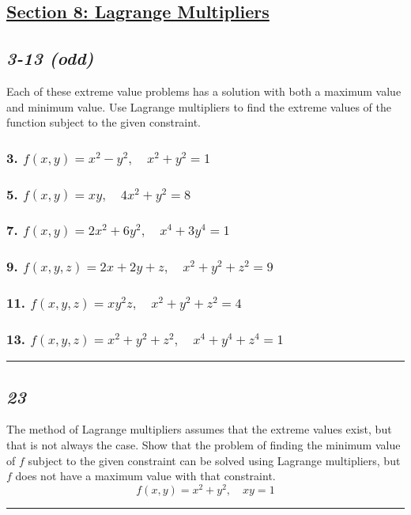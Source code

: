 \documentclass{article}
\newcommand{\spc}{\vspace{1em}\hrule\vspace{1em}}
\begin{document}
{{{{{{{{{{{{\begin{center}
    \section*{\underline{Section 8: Lagrange Multipliers}}
\end{center}
\begin{center}
    \subsection*{\textit{3-13 (odd)}} 
\end{center}
Each of these extreme value problems has a solution with both a maximum
value and minimum value. Use Lagrange multipliers to find the extreme values
of the function subject to the given constraint. 
\subsubsection*{3. $f(x,y) = x^2 -y^2,\quad x^2+y^2=1$}
\subsubsection*{5. $f(x,y) = xy,\quad 4x^2+y^2=8$}
\subsubsection*{7. $f(x,y) = 2x^2+6y^2,\quad x^4+3y^4=1$}
\subsubsection*{9. $f(x,y, z) = 2x+2y+z,\quad x^2+y^2+z^2 = 9$}
\subsubsection*{11. $f(x,y, z) = xy^2z,\quad x^2+y^2+z^2=4$}
\subsubsection*{13. $f(x,y, z) = x^2+y^2+z^2,\quad x^4+y^4+z^4=1$}
\spc
\begin{center}
    \subsection*{\textit{23}} 
\end{center}
The method of Lagrange multipliers assumes that the extreme values exist,
but that is not always the case. Show that the problem of finding the
minimum value of $f$ subject to the given constraint can be solved using
Lagrange multipliers, but $f$ does not have a maximum value with that constraint.
\[
f(x,y) = x^2+y^2,\quad xy=1
\]
\spc
\begin{center}

\end{center}}}}}}}}}}}}}
\end{document}
